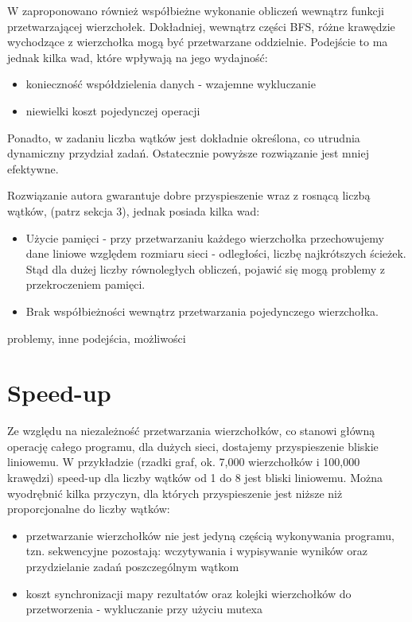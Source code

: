 \documentclass[]{article}
\begin{document}
W \parencite[p. 539-550]{bader:06} zaproponowano również współbieżne wykonanie obliczeń wewnątrz funkcji przetwarzającej wierzchołek. Dokładniej, wewnątrz części BFS, różne krawędzie wychodzące z wierzchołka mogą być przetwarzane oddzielnie. Podejście to ma jednak kilka wad, które wpływają na jego wydajność:
\begin{itemize}
\item konieczność współdzielenia danych - wzajemne wykluczanie 
\item niewielki koszt pojedynczej operacji 
\end{itemize}
Ponadto, w zadaniu liczba wątków jest dokładnie określona, co utrudnia dynamiczny przydział zadań. Ostatecznie powyższe rozwiązanie jest mniej efektywne.

Rozwiązanie autora gwarantuje dobre przyspieszenie wraz z rosnącą liczbą wątków, (patrz sekcja 3), jednak posiada kilka wad:
\begin{itemize}
\item Użycie pamięci - przy przetwarzaniu każdego wierzchołka przechowujemy dane liniowe względem rozmiaru sieci - odległości, liczbę najkrótszych ścieżek. Stąd dla dużej liczby równoległych obliczeń, pojawić się mogą problemy z przekroczeniem pamięci.

\item Brak współbieżności wewnątrz przetwarzania pojedynczego wierzchołka.

\end{itemize}

problemy, inne podejścia, możliwości


\section{Speed-up}

Ze względu na niezależność przetwarzania wierzchołków, co stanowi główną operację całego programu, dla dużych sieci, dostajemy przyspieszenie bliskie liniowemu.
W przykładzie (rzadki graf, ok. 7,000 wierzchołków i 100,000 krawędzi) speed-up dla liczby wątków od 1 do 8 jest bliski liniowemu.
Można wyodrębnić kilka przyczyn, dla których przyspieszenie jest niższe niż proporcjonalne do liczby wątków:
\begin{itemize}
\item przetwarzanie wierzchołków nie jest jedyną częścią wykonywania programu, tzn. sekwencyjne pozostają: wczytywania i wypisywanie wyników oraz przydzielanie zadań poszczególnym wątkom
\item koszt synchronizacji mapy rezultatów oraz kolejki wierzchołków do przetworzenia - wykluczanie przy użyciu mutexa

\end{itemize}
\end{document}
